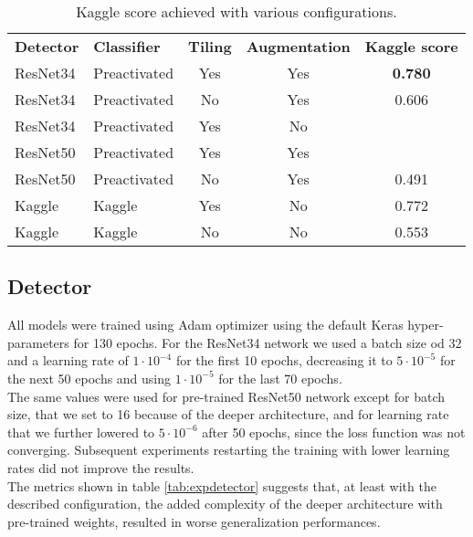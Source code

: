 \begin{table*}[h]
	\begin{tabular}{llccc}
		\rowcolor[HTML]{EFEFEF} 
		\textbf{Detector} & \textbf{Classifier} & \textbf{Tiling} & \textbf{Augmentation} & \textbf{Kaggle score} \\
		ResNet34          & Preactivated        & Yes             & Yes                   & \textbf{0.780}                 \\
		ResNet34          & Preactivated        & No              & Yes                   & 0.606                 \\
		ResNet34          & Preactivated        & Yes             & No                    &                       \\
		ResNet50          & Preactivated        & Yes             & Yes                   &                       \\
		ResNet50          & Preactivated        & No              & Yes                   & 0.491                 \\
		Kaggle            & Kaggle              & Yes             & No                   &  0.772                     \\
		Kaggle            & Kaggle              & No              & No                   & 0.553                     
	\end{tabular}
	\caption{Kaggle score achieved with various configurations.}
	\label{tab:finaltests}
\end{table*}

\subsection{Detector}
\label{ssec:detectorexp}

All models were trained using Adam optimizer using the default Keras hyper-parameters for 130 epochs. For the ResNet34 network we used a batch size od $32$ and a learning rate of $1 \cdot 10^{-4}$ for the first 10 epochs, decreasing it to $5 \cdot 10^{-5}$ for the next 50 epochs and using $1 \cdot 10^{-5}$ for the last 70 epochs. \\
The same values were used for pre-trained ResNet50 network except for batch size, that we set to 16 because of the deeper architecture, and for learning rate that we further lowered to $5 \cdot 10^{-6}$ after 50 epochs, since the loss function was not converging. Subsequent experiments restarting the training with lower learning rates did not improve the results.\\
The metrics shown in table \ref{tab:expdetector} suggests that, at least with the described configuration, the added complexity of the deeper architecture with pre-trained weights, resulted in worse generalization performances.

